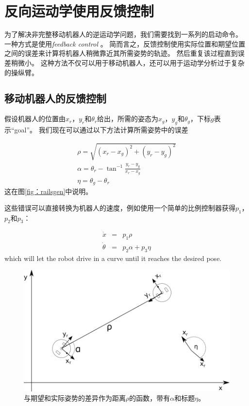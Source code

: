\section{反向运动学使用反馈控制} 
\label{sec:advinvkinematics}
为了解决非完整移动机器人的逆运动学问题，我们需要找到一系列的启动命令。 一种方式是使用\emph{feedback control} 。 简而言之，反馈控制使用实际位置和期望位置之间的误差来计算将机器人稍微靠近其所需姿势的轨迹。 然后重复该过程直到误差稍微小。 这种方法不仅可以用于移动机器人，还可以用于运动学分析过于复杂的操纵臂。

\subsection {移动机器人的反馈控制} \label {sec：fbmobile}
假设机器人的位置由$ x_r，y_r $和$ \theta_r $给出，所需的姿态为$ x_g，y_g $和$ \theta_g $，下标$ g $表示“goal”。
我们现在可以通过以下方法计算所需姿势中的误差

\begin{eqnarray}
\rho=\sqrt{(x_r-x_g)^2+(y_r-y_g)^2}\\
\nonumber
\alpha=\theta_r-\tan^{-1}{\frac{y_r-y_g}{x_r-x_g}}\\
\nonumber
\eta=\theta_g-\theta_r
\end{eqnarray}
这在图\ref {fig：railsgen}中说明。


这些错误可以直接转换为机器人的速度，例如使用一个简单的比例控制器获得$ p_1 $，$ p_2 $和$ p_3 $：

\begin{eqnarray}
\dot{x} &=& p_1 \rho\\
\dot{\theta} &=& p_2 \alpha + p_3 \eta
\end{eqnarray}
which will let the robot drive in a curve until it reaches the desired pose. 

\begin{figure}
	\centering
		\includegraphics[width=\textwidth]{figs/trajectorygen}
	\caption {与期望和实际姿势的差异作为距离$ \rho $的函数，带有$ \alpha $和标题$ \eta $。}
	\label{fig:trajectorygen}
\end{figure}


